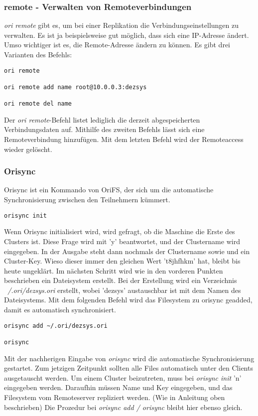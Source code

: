 \subsubsection{remote - Verwalten von Remoteverbindungen}
\label{subsubsec:remote - Verwalten von Remoteverbindungen}
\textit{ori remote} gibt es, um bei einer Replikation die Verbindungseinstellungen zu verwalten. Es ist ja beispielsweise gut möglich, dass sich eine IP-Adresse ändert. Umso wichtiger ist es, die Remote-Adresse ändern zu können. Es gibt drei Varianten des Befehls:
\begin{lstlisting}[frame=single, caption=remote]
ori remote

ori remote add name root@10.0.0.3:dezsys

ori remote del name
\end{lstlisting}
Der \textit{ori remote}-Befehl listet lediglich die derzeit abgespeicherten Verbindungsdaten auf. Mithilfe des zweiten Befehls lässt sich eine Remoteverbindung hinzufügen. Mit dem letzten Befehl wird der Remoteaccess wieder gelöscht.

\subsubsection{Orisync}
\label{subsubsec:Orisync}
Orisync ist ein Kommando von OriFS, der sich um die automatische Synchronisierung zwischen den Teilnehmern kümmert. \newline
\begin{lstlisting}[frame=single, caption=orisync init]
orisync init
\end{lstlisting}
Wenn Orisync initialisiert wird, wird gefragt, ob die Maschine die Erste des Clusters ist. Diese Frage wird mit 'y' beantwortet, und der Clustername wird eingegeben. In der Ausgabe steht dann nochmals der Clustername sowie und ein Cluster-Key. Wieso dieser immer den gleichen Wert 't8jhfhkm' hat, bleibt bis heute ungeklärt. Im nächsten Schritt wird wie in den vorderen Punkten beschrieben ein Dateisystem erstellt. Bei der Erstellung wird ein Verzeichnis \textit{~/.ori/dezsys.ori} erstellt, wobei 'dezsys' austauschbar ist mit dem Namen des Dateisystems. Mit dem folgenden Befehl wird das Filesystem zu orisync geadded, damit es automatisch synchronisiert. 
\begin{lstlisting}[frame=single, caption=orisync add]
orisync add ~/.ori/dezsys.ori

orisync
\end{lstlisting}
Mit der nachherigen Eingabe von \textit{orisync} wird die automatische Synchronisierung gestartet. Zum jetzigen Zeitpunkt sollten alle Files automatisch unter den Clients ausgetauscht werden. \newline
Um einem Cluster beizutreten, muss bei \textit{orisync init} 'n' eingegeben werden. Daraufhin müssen Name und Key eingegeben, und das Filesystem vom Remoteserver repliziert werden. (Wie in Anleitung oben beschrieben) Die Prozedur bei \textit{orisync add / orisync} bleibt hier ebenso gleich.

